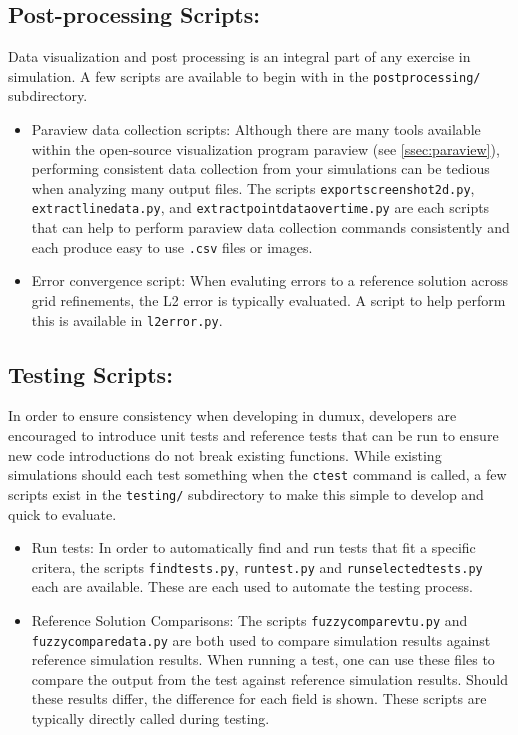 \subsection{Post-processing Scripts:} \label{ssec:postprocessingScripts}
Data visualization and post processing is an integral part of any exercise in simulation. A few scripts are available to begin with in the \texttt{postprocessing/} subdirectory. 
\begin{itemize}
	\item Paraview data collection scripts: Although there are many tools available within the open-source visualization program paraview (see \ref{ssec:paraview}), performing consistent data collection from your simulations can be tedious when analyzing many output files. The scripts \texttt{exportscreenshot2d.py}, \texttt{extractlinedata.py}, and \texttt{extractpointdataovertime.py} are each scripts that can help to perform paraview data collection commands consistently and each produce easy to use \texttt{.csv} files or images. 
	\item Error convergence script: When evaluting errors to a reference solution across grid refinements, the L2 error is typically evaluated. A script to help perform this is available in \texttt{l2error.py}.
\end{itemize}

\subsection{Testing Scripts:} \label{ssec:testingScripts}
In order to ensure consistency when developing in dumux, developers are encouraged to introduce unit tests and reference tests that can be run to ensure new code introductions do not break existing functions. While existing simulations should each test something when the \texttt{ctest} command is called, a few scripts exist in the \texttt{testing/} subdirectory to make this simple to develop and quick to evaluate.
\begin{itemize}
	\item Run tests: In order to automatically find and run tests that fit a specific critera, the scripts \texttt{findtests.py}, \texttt{runtest.py} and \texttt{runselectedtests.py} each are available. These are each used to automate the testing process.  
	\item Reference Solution Comparisons: The scripts \texttt{fuzzycomparevtu.py} and \texttt{fuzzycomparedata.py} are both used to compare simulation results against reference simulation results. When running a test, one can use these files to compare the output from the test against reference simulation results. Should these results differ, the difference for each field is shown. These scripts are typically directly called during testing. 
\end{itemize}

